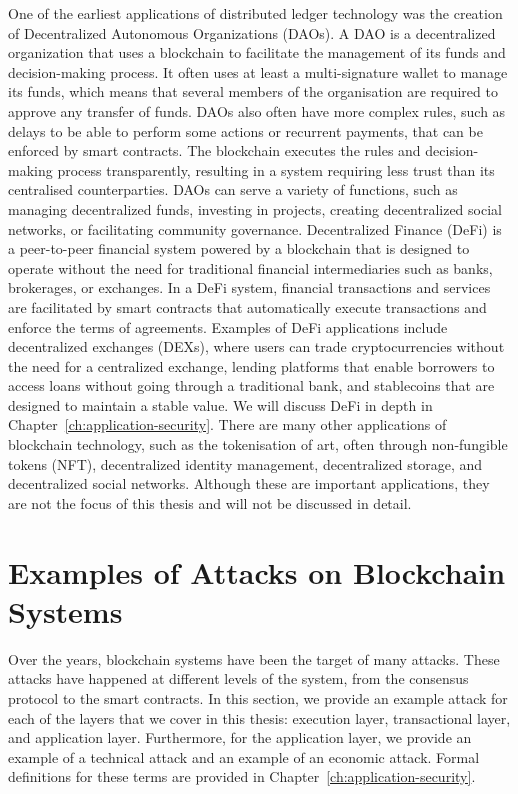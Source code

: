 One of the earliest applications of distributed ledger technology was the creation of Decentralized Autonomous Organizations (DAOs).
A DAO is a decentralized organization that uses a blockchain to facilitate the management of its funds and decision-making process.
It often uses at least a multi-signature wallet to manage its funds, which means that several members of the organisation are required to approve any transfer of funds.
DAOs also often have more complex rules, such as delays to be able to perform some actions or recurrent payments, that can be enforced by smart contracts.
The blockchain executes the rules and decision-making process transparently, resulting in a system requiring less trust than its centralised counterparties.
DAOs can serve a variety of functions, such as managing decentralized funds, investing in projects, creating decentralized social networks, or facilitating community governance.
Decentralized Finance (DeFi) is a peer-to-peer financial system powered by a blockchain that is designed to operate without the need for traditional financial intermediaries such as banks, brokerages, or exchanges.
In a DeFi system, financial transactions and services are facilitated by smart contracts that automatically execute transactions and enforce the terms of agreements.
Examples of DeFi applications include decentralized exchanges (DEXs), where users can trade cryptocurrencies without the need for a centralized exchange, lending platforms that enable borrowers to access loans without going through a traditional bank, and stablecoins that are designed to maintain a stable value.
We will discuss DeFi in depth in Chapter~\ref{ch:application-security}.
 There are many other applications of blockchain technology, such as the tokenisation of art, often through non-fungible tokens (NFT), decentralized identity management, decentralized storage, and decentralized social networks.
Although these are important applications, they are not the focus of this thesis and will not be discussed in detail.

\section{Examples of Attacks on Blockchain Systems}

Over the years, blockchain systems have been the target of many attacks.
These attacks have happened at different levels of the system, from the consensus protocol to the smart contracts.
In this section, we provide an example attack for each of the layers that we cover in this thesis: execution layer, transactional layer, and application layer.
Furthermore, for the application layer, we provide an example of a technical attack and an example of an economic attack.
Formal definitions for these terms are provided in Chapter~\ref{ch:application-security}.

